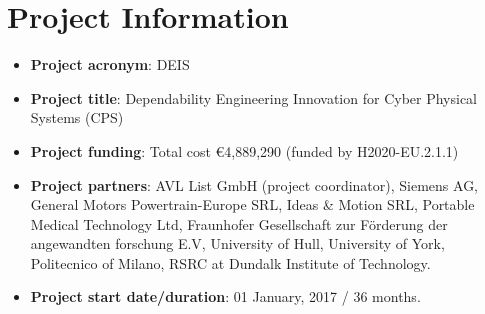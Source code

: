 \section{Project Information}
\begin{itemize}
	\item \textbf{Project acronym}: DEIS
	\item \textbf{Project title}: Dependability Engineering Innovation for Cyber Physical Systems (CPS)
	\item \textbf{Project funding}: Total cost \euro 4,889,290 (funded by H2020-EU.2.1.1)
	\item \textbf{Project partners}: AVL List GmbH (project coordinator), Siemens AG, General Motors Powertrain-Europe SRL, Ideas \& Motion SRL, Portable Medical Technology Ltd, Fraunhofer Gesellschaft zur F{\"o}rderung der angewandten forschung E.V, University of Hull, University of York, Politecnico of Milano, RSRC at Dundalk Institute of Technology.
	\item \textbf{Project start date/duration}: 01 January, 2017 / 36 months.
\end{itemize}